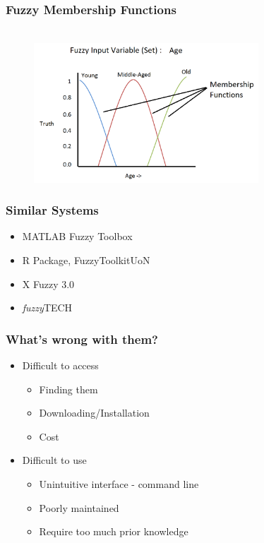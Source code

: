 \documentclass{beamer}
\begin{document}
\begin{frame}
	\frametitle{Fuzzy Membership Functions}
	\begin{figure}[c]
	 \ \\
		\includegraphics[width=0.75\textwidth]{images/Picture8.png}
	\end{figure}
\end{frame}




\begin{frame}
  \frametitle{Similar Systems}
		\pause
		\begin{itemize}
		\item MATLAB Fuzzy Toolbox
		\pause
		\item R Package, FuzzyToolkitUoN
		\pause
		\item X Fuzzy 3.0
		\pause
		\item \emph{fuzzy}TECH
		\end{itemize}
\end{frame}


\begin{frame}
\frametitle{What's wrong with them?}

\begin{itemize}
\pause
		\item Difficult to access
				\pause
				\begin{itemize}
				\item Finding them \pause
				\item Downloading/Installation \pause
				\item Cost \pause
				\end{itemize} 
		\item Difficult to use \pause
			\begin{itemize}
			\item Unintuitive interface - command line\pause
			\item Poorly maintained \pause
			\item Require too much prior knowledge
			\end{itemize}
		\end{itemize}
\end{frame}
\end{document}

